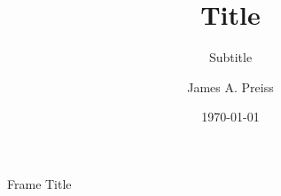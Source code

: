 \documentclass[aspectratio=149,xcolor={dvipsnames}]{beamer}
\title{Title}
\subtitle{Subtitle}
\author{James A. Preiss}
\institute{University of California, Santa Barbara}
\date{\monthyear\today}
\begin{document}
\frame{\titlepage}

\begin{frame}{Frame Title}
\end{frame}
\end{document}
